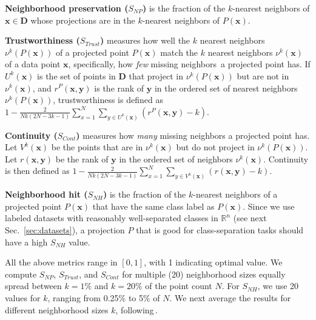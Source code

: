 \noindent\textbf{Neighborhood preservation ($S_{NP}$)} is the fraction of the $k$-nearest neighbors of $\mathbf{x} \in \mathbf{D}$ whose projections are in the $k$-nearest neighbors of $P(\mathbf{x})$.

\noindent\textbf{Trustworthiness ($S_{Trust}$)} measures how well the $k$ nearest neighbors $\nu^k(P(\mathbf{x}))$ of a projected point $P(\mathbf{x})$ match the $k$ nearest neighbors $\nu^k(\mathbf{x})$ of a data point $\mathbf{x}$, specifically, how \emph{few} missing neighbors\,\cite{Martins2014} a projected point has. If $U^k(\mathbf{x})$ is the set of points in $\mathbf{D}$ that project in $\nu^k(P(\mathbf{x}))$ but are not in $\nu^k(\mathbf{x})$,
and $r^P(\mathbf{x},\mathbf{y})$ is the rank of $\mathbf{y}$ in the ordered set of nearest neighbors $\nu^k(P(\mathbf{x}))$, trustworthiness is defined as \linebreak
$1-\frac{2}{N k(2 N-3 k-1)} \sum_{x=1}^{N} \sum_{y \in U^k(\mathbf{x})}(r^P(\mathbf{x}, \mathbf{y})-k)$.

\noindent\textbf{Continuity ($S_{Cont}$)} measures how \emph{many} missing neighbors a projected point has. Let $V^k(\mathbf{x})$
be the points that are in $\nu^k(\mathbf{x})$ but do not project in $\nu^k(P(\mathbf{x}))$. Let ${r}(\mathbf{x}, \mathbf{y})$ be the rank of $\mathbf{y}$ in the ordered set of neighbors $\nu^k(\mathbf{x})$. Continuity is then defined as \linebreak
$1-\frac{2}{N k(2 N-3 k-1)} \sum_{x=1}^{N} \sum_{y \in V^k(\mathbf{x})}({r}(\mathbf{x}, \mathbf{y})-k)$.

\noindent\textbf{Neighborhood hit ($S_{NH}$)} is the fraction of the $k$-nearest neighbors of a projected point $P(\mathbf{x})$ that have the same class label as $P(\mathbf{x})$. Since we use labeled datasets with reasonably well-separated classes in $\mathbb{R}^n$ (see next Sec.~\ref{sec:datasets}), a projection $P$ that is good for class-separation tasks should have a high $S_{NH}$ value.

All the above metrics range in $[0,1]$, with 1 indicating optimal value. 
We compute $S_{NP}$, $S_{Trust}$, and $S_{Cont}$ for multiple (20) neighborhood sizes equally spread between $k=1\%$ and $k=20\%$ of the point count $N$. For $S_{NH}$, we use 20 values for $k$, ranging from 0.25\% to 5\% of $N$. 
We next average the results for different neighborhood sizes $k$, following\,\cite{Vernier2020,Martins2015}.

